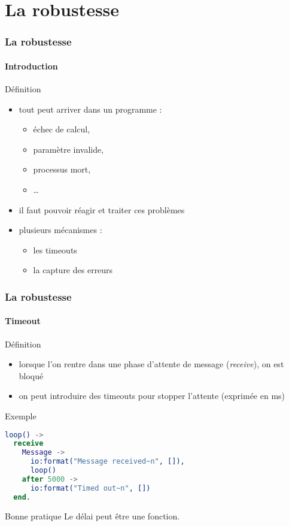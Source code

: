 \section{La robustesse}

\begin{frame}
  \frametitle{La robustesse}
  \framesubtitle{Introduction}

  \begin{block}{Définition}
    \begin{itemize}
    \item tout peut arriver dans un programme :
      \begin{itemize}
      \item échec de calcul,
      \item paramètre invalide,
      \item processus mort,
      \item \ldots
      \end{itemize}
    \item il faut pouvoir réagir et traiter ces problèmes
    \item plusieurs mécanismes :
      \begin{itemize}
      \item les timeouts
      \item la capture des erreurs
      \end{itemize}
    \end{itemize}
  \end{block}

\end{frame}

\begin{frame}[fragile]
  \frametitle{La robustesse}
  \framesubtitle{Timeout}

  \begin{block}{Définition}
    \begin{itemize}
    \item lorsque l'on rentre dans une phase d'attente de message
      (\textit{receive}), on est bloqué
    \item on peut introduire des timeouts pour stopper l'attente (exprimée en
      ms)
    \end{itemize}
  \end{block}

  \begin{exampleblock}{Exemple}
    \begin{lstlisting}[language=erlang]
loop() ->
  receive
    Message ->
      io:format("Message received~n", []),
      loop()
    after 5000 ->
      io:format("Timed out~n", [])
  end.
    \end{lstlisting}
  \end{exampleblock}

  \begin{alertblock}{Bonne pratique}
    Le délai peut être une fonction.
  \end{alertblock}

\end{frame}

